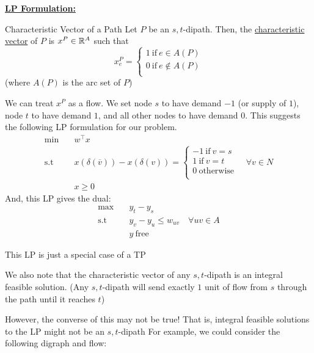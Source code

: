 \underline{\textbf{LP Formulation:}}
\begin{definition}{Characteristic Vector of a Path}{}
    Let $P$ be an $s,t$-dipath. Then, the \underline{characteristic vector} of $P$ is $x^P \in \mathbb{R}^A$ such that
    \[
        x^P_e = \begin{cases}
            1 \:\text{if}\:e\in A(P) \\ 
            0 \:\text{if}\:e\not\in A(P) \\ 
        \end{cases}    
    \]
    (where $A(P)$ is the arc set of $P$)
\end{definition}
We can treat $x^P$ as a flow. We set node $s$ to have demand $-1$ (or supply of $1$), node $t$ to have demand $1$, and all other nodes to have demand $0$.
This suggests the following LP formulation for our problem.
\begin{equation}\label{eq:shortest-dipath_lp-formulation}
\begin{aligned}
    \min \quad &w^\intercal x \\
    \text{s.t} \quad &x(\delta(\overline{v})) - x(\delta(v)) = \begin{cases}
        -1 \:\text{if}\:v=s \\
        1 \:\text{if}\:v=t \\
        0 \:\text{otherwise} \\
    \end{cases}\quad \forall v \in N \\
    &x \geq 0
\end{aligned}
\end{equation}
And, this LP gives the dual:
\begin{equation}\label{eq:shortest-dipath_dual-formulation}
\begin{aligned}
    \max \quad &y_t - y_s \\
    \text{s.t} \quad &y_v - y_u \leq w_{uv} \quad \forall uv \in A \\
    &y\:\text{free}
\end{aligned}
\end{equation}
\begin{note} 
    This LP is just a special case of a TP
\end{note}
We also note that the characteristic vector of any $s,t$-dipath is an integral feasible solution. (Any $s,t$-dipath will send exactly $1$ unit of flow from $s$ through the path until it reaches $t$)

However, the converse of this may not be true!
That is, integral feasible solutions to the LP might not be an $s,t$-dipath
For example, we could consider the following digraph and flow:

